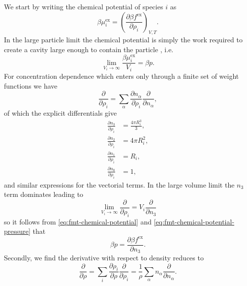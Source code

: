 We start by writing the chemical potential of species $i$ as
\begin{equation}\label{eq:fmt-chemical-potential}
  \beta \mu_i^\mathrm{ex}
  =
  \left(
  \frac{\partial \beta f^\mathrm{ex}}{\partial \rho_i}
  \right)_{V,T}.
\end{equation}
In the large particle limit the chemical potential is simply the work required to create a cavity large enough to contain the particle%
,
i.e.\ \cite{RothJPCM2002,ReissJCP1960}
\begin{equation}\label{eq:fmt-chemical-potential-pressure}
  \lim_{V_i \to \infty} \frac{\beta \mu_i^\mathrm{ex}}{V_i} = \beta p.
\end{equation}
For concentration dependence which enters only through a finite set of weight functions we have
\begin{equation*}
  \frac{\partial}{\partial \rho_i}
  =
  \sum_\alpha
  \frac{\partial n_\alpha}{\partial \rho_i}
  \frac{\partial}{\partial n_\alpha},
\end{equation*}
of which the explicit differentials give
\begin{subequations}\label{eq:fmt-n-derivatives}
  \begin{align}
    \frac{\partial n_3}{\partial \rho_i}
    &=
    \frac{4 \pi R_i^3}{3},
    \\
    \frac{\partial n_2}{\partial \rho_i}
    &=
    4 \pi R_i^2,
    \\
    \frac{\partial n_1}{\partial \rho_i}
    &=
    R_i,
    \\
    \frac{\partial n_0}{\partial \rho_i}
    &=
    1,
  \end{align}
\end{subequations}
and similar expressions for the vectorial terms.
In the large volume limit the $n_3$ term dominates leading to
\begin{equation*}
  \lim_{V_i \to \infty}
  \frac{\partial}{\partial \rho_i}
  =
  V_i \frac{\partial}{\partial n_3}
\end{equation*}
so it follows from \eqref{eq:fmt-chemical-potential} and \eqref{eq:fmt-chemical-potential-pressure} that
\begin{equation}\label{eq:fmt-pressure}
  \beta p
  =
  \frac{\partial \beta f^\mathrm{ex} }{\partial n_3}.
\end{equation}
Secondly, we find the derivative with respect to density reduces to
\begin{equation*}
  \frac{\partial}{\partial \rho}
  =
  \sum_i
  \frac{\partial \rho_i}{\partial \rho}
  \frac{\partial}{\partial \rho_i}
  =
  \frac{1}{\rho}
  \sum_\alpha
  n_\alpha
  \frac{\partial}{\partial n_\alpha}.
\end{equation*}

